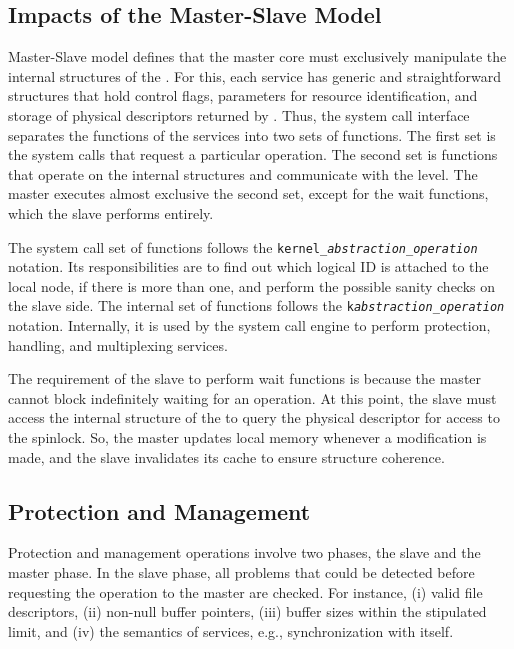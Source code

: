 		\subsection{Impacts of the Master-Slave Model}

			Master-Slave model defines that the master core must exclusively manipulate
			the internal structures of the \os. For this, each service has generic and
			straightforward structures that hold control flags, parameters for resource
			identification, and storage of physical descriptors returned by \hal. Thus,
			the system call interface separates the functions of the services into two
			sets of functions. The first set is the system calls that request a particular
			operation. The second set is functions that operate on the internal structures
			and communicate with the \hal level. The master executes almost exclusive
			the second set, except for the wait functions, which the slave performs entirely.

			The system call set of functions follows the \texttt{kernel\_\textit{abstraction}\_\textit{operation}}
			notation. Its responsibilities are to find out which logical ID is attached to
			the local node, if there is more than one, and perform the possible sanity
			checks on the slave side. The internal set of functions follows the
			\texttt{k\textit{abstraction}\_\textit{operation}} notation. Internally, it
			is used by the system call engine to perform protection, handling, and
			multiplexing services. 

			The requirement of the slave to perform wait functions is because the master
			cannot block indefinitely waiting for an operation. At this point, the slave
			must access the internal structure of the \os to query the physical descriptor
			for access to the \hal spinlock. So, the master updates local memory whenever
			a modification is made, and the slave invalidates its cache to ensure structure
			coherence.

		\subsection{Protection and Management}

			Protection and management operations involve two phases, the slave and the master phase.
			In the slave phase, all problems that could be detected before requesting the operation
			to the master are checked.
			For instance,
			(i) valid file descriptors,
			(ii) non-null buffer pointers,
			(iii) buffer sizes within the stipulated limit, and
			(iv) the semantics of services, e.g., synchronization with itself.

